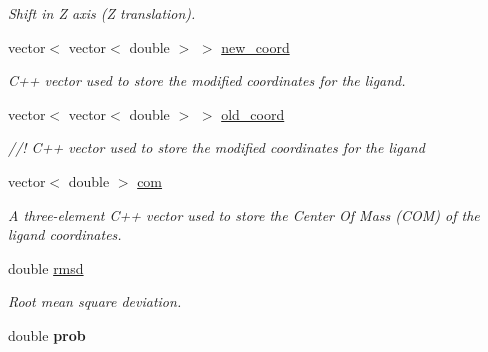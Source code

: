 \begin{DoxyCompactItemize}
\begin{DoxyCompactList}\small\item\em Shift in Z axis (Z translation). \item\end{DoxyCompactList}\item 
\hypertarget{classTEMP__SCHEME_a1aaff4e2a3376926d5472f2587b023e0}{
vector$<$ vector$<$ double $>$ $>$ \hyperlink{classTEMP__SCHEME_a1aaff4e2a3376926d5472f2587b023e0}{new\_\-coord}}
\label{classTEMP__SCHEME_a1aaff4e2a3376926d5472f2587b023e0}

\begin{DoxyCompactList}\small\item\em C++ vector used to store the modified coordinates for the ligand. \item\end{DoxyCompactList}\item 
\hypertarget{classTEMP__SCHEME_a4ca9c3372e36d3413ef02b85251a82f6}{
vector$<$ vector$<$ double $>$ $>$ \hyperlink{classTEMP__SCHEME_a4ca9c3372e36d3413ef02b85251a82f6}{old\_\-coord}}
\label{classTEMP__SCHEME_a4ca9c3372e36d3413ef02b85251a82f6}

\begin{DoxyCompactList}\small\item\em //! C++ vector used to store the modified coordinates for the ligand \item\end{DoxyCompactList}\item 
\hypertarget{classTEMP__SCHEME_aaf43fccb23d081260d67fe428c57b5c5}{
vector$<$ double $>$ \hyperlink{classTEMP__SCHEME_aaf43fccb23d081260d67fe428c57b5c5}{com}}
\label{classTEMP__SCHEME_aaf43fccb23d081260d67fe428c57b5c5}

\begin{DoxyCompactList}\small\item\em A three-\/element C++ vector used to store the Center Of Mass (COM) of the ligand coordinates. \item\end{DoxyCompactList}\item 
\hypertarget{classTEMP__SCHEME_aa9ff9bc8b5661275344c7c4c955b6261}{
double \hyperlink{classTEMP__SCHEME_aa9ff9bc8b5661275344c7c4c955b6261}{rmsd}}
\label{classTEMP__SCHEME_aa9ff9bc8b5661275344c7c4c955b6261}

\begin{DoxyCompactList}\small\item\em Root mean square deviation. \item\end{DoxyCompactList}\item 
\hypertarget{classTEMP__SCHEME_aea8b208dc0e8f1ee975638e7d848d122}{
double {\bfseries prob}}
\label{classTEMP__SCHEME_aea8b208dc0e8f1ee975638e7d848d122}


\end{DoxyCompactItemize}
